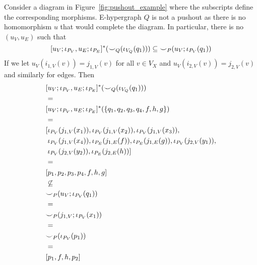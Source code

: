 \begin{example}
    Consider a diagram in Figure~\ref{fig:pushout_example} where the subscripts define the corresponding morphisms.
    E-hypergraph $Q$ is not a pushout as there is no homomorphism $u$ that would complete the diagram.
    In particular, there is no $(u_{V},u_{E})$ such that 
    \[
        [u_{V};\iota_{P_{V}},u_{E};\iota_{P_{E}}]^{*}({\smile}_{Q}(\iota_{V_{Q}}(q_1))) \subseteq {\smile}_{P}(u_{V};\iota_{P_{V}}(q_1))
    \]
    If we let $u_{V}(i_{1,V}(v)) = j_{1,V}(v)$ for all $v \in V_{X}$ and $u_{V}(i_{2,V}(v)) = j_{2,V}(v)$ and similarly for edges.
    Then 
    \begin{align*}
        &[u_{V};\iota_{P_{V}}, u_{E};\iota_{P_{E}}]^{*}({\smile}_{Q}(\iota_{V_{Q}}(q_1)))\\
        &=\\
        &[u_{V};\iota_{P_{V}}, u_{E};\iota_{P_{E}}]^{*}(\{q_1, q_2, q_3, q_4, f, h, g\})\\
        &=\\
        &[\iota_{P_{V}}(j_{1,V}(x_1)), \iota_{P_{V}}(j_{1,V}(x_2)), \iota_{P_{V}}(j_{1,V}(x_3)),\\
         &\; \iota_{P_{V}}(j_{1,V}(x_4)), \iota_{P_{E}}(j_{1,E}(f)), \iota_{P_{E}}(j_{1,E}(g)), \iota_{P_{V}}(j_{2,V}(y_1)),\\
         &\; \iota_{P_{V}}(j_{2,V}(y_2)), \iota_{P_{E}}(j_{2,E}(h))]\\
        &=\\
        &[p_1, p_2, p_3, p_4, f, h, g]\\
        &\not \subseteq\\
        &{\smile}_{P}(u_{V};\iota_{P_{V}}(q_1))\\
        &=\\
        &{\smile}_{P}(j_{1,V};\iota_{P_{V}}(x_1))\\
        &=\\
        &{\smile}_{P}(\iota_{P_{V}}(p_1))\\
        &=\\
        &[p_1, f, h, p_2]
    \end{align*}
\end{example}



